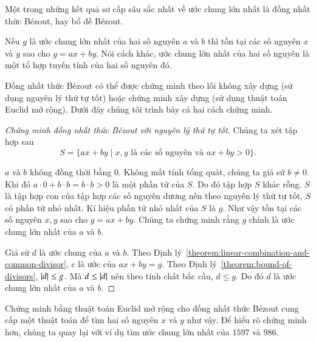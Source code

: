 Một trong những kết quả sơ cấp sâu sắc nhất về ước chung lớn nhất là đồng nhất thức B\'{e}zout, hay bổ đề B\'{e}zout.

\begin{theorem}
	Nếu $g$ là ước chung lớn nhất của hai số nguyên $a$ và $b$ thì tồn tại các số nguyên $x$ và $y$ sao cho $g = a x + b y$. Nói cách khác, ước chung lớn nhất của hai số nguyên là một tổ hợp tuyến tính của hai số nguyên đó.
\end{theorem}

Đồng nhất thức B\'{e}zout có thể được chứng minh theo lối không xây dựng (sử dụng nguyên lý thứ tự tốt) hoặc chứng minh xây dựng (sử dụng thuật toán Euclid mở rộng). Dưới đây chúng tôi trình bày cả hai cách chứng minh.

\begin{proof}[Chứng minh đồng nhất thức B\'{e}zout với nguyên lý thứ tự tốt]
	Chúng ta xét tập hợp sau
	\[
		S = \{ a x + b y \mid \text{$x, y$ là các số nguyên và $a x + b y > 0$} \}.
	\]

	$a$ và $b$ không đồng thời bằng $0$. Không mất tính tổng quát, chúng ta giả sử $b\ne 0$. Khi đó $a\cdot 0 + b\cdot b = b\cdot b > 0$ là một phần tử của $S$. Do đó tập hợp $S$ khác rỗng. $S$ là tập hợp con của tập hợp các số nguyên dương nên theo nguyên lý thứ tự tốt, $S$ có phần tử nhỏ nhất. Kí hiệu phần tử nhỏ nhất của $S$ là $g$. Như vậy tồn tại các số nguyên $x, y$ sao cho $g = a x + b y$. Chúng ta chứng minh rằng $g$ chính là ước chung lớn nhất của $a$ và $b$.

	Giả sử $d$ là ước chung của $a$ và $b$. Theo Định lý~\ref{theorem:linear-combination-and-common-divisor}, $c$ là ước của $a x + b y = g$. Theo Định lý~\ref{theorem:bound-of-divisors}, $\left\vert{d}\right\vert\leq g$. Mà $d\leq \left\vert{d}\right\vert$ nên theo tính chất bắc cầu, $d\leq g$. Do đó $d$ là ước chung lớn nhất của $a$ và $b$.
\end{proof}

Chứng minh bằng thuật toán Euclid mở rộng cho đồng nhất thức B\'{e}zout cung cấp một thuật toán để tìm hai số nguyên $x$ và $y$ như vậy. Để hiểu rõ chứng minh hơn, chúng ta quay lại với ví dụ tìm ước chung lớn nhất của $1597$ và $986$.

